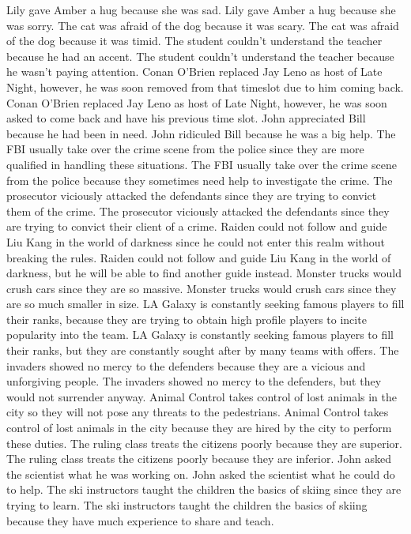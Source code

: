 \documentclass{article}
\begin{document}
\begin{enumerate}
	Lily gave Amber a hug because she was sad.
	Lily gave Amber a hug because she was sorry.
	The cat was afraid of the dog because it was scary.
	The cat was afraid of the dog because it was timid.
	The student couldn't understand the teacher because he had an accent.
	The student couldn't understand the teacher because he wasn't paying attention.
	Conan O'Brien replaced Jay Leno as host of Late Night, however, he was soon removed from that timeslot due to him coming back.
	Conan O'Brien replaced Jay Leno as host of Late Night, however, he was soon asked to come back and have his previous time slot.
	John appreciated Bill because he had been in need.
	John ridiculed Bill because he was a big help.
	The FBI usually take over the crime scene from the police since they are more qualified in handling these situations.
	The FBI usually take over the crime scene from the police because they sometimes need help to investigate the crime.
	The prosecutor viciously attacked the defendants since they are trying to convict them of the crime.
	The prosecutor viciously attacked the defendants since they are trying to convict their client of a crime.
	Raiden could not follow and guide Liu Kang in the world of darkness since he could not enter this realm without breaking the rules.
	Raiden could not follow and guide Liu Kang in the world of darkness, but he will be able to find another guide instead.
	Monster trucks would crush cars since they are so massive.
	Monster trucks would crush cars since they are so much smaller in size.
	LA Galaxy is constantly seeking famous players to fill their ranks, because they are trying to obtain high profile players to incite popularity into the team.
	LA Galaxy is constantly seeking famous players to fill their ranks, but they are constantly sought after by many teams with offers.
	The invaders showed no mercy to the defenders because they are a vicious and unforgiving people.
	The invaders showed no mercy to the defenders, but they would not surrender anyway.
	Animal Control takes control of lost animals in the city so they will not pose any threats to the pedestrians.
	Animal Control takes control of lost animals in the city because they are hired by the city to perform these duties.
	The ruling class treats the citizens poorly because they are superior.
	The ruling class treats the citizens poorly because they are inferior.
	John asked the scientist what he was working on.
	John asked the scientist what he could do to help.
	The ski instructors taught the children the basics of skiing since they are trying to learn.
	The ski instructors taught the children the basics of skiing because they have much experience to share and teach.

\end{enumerate}
\end{document}
